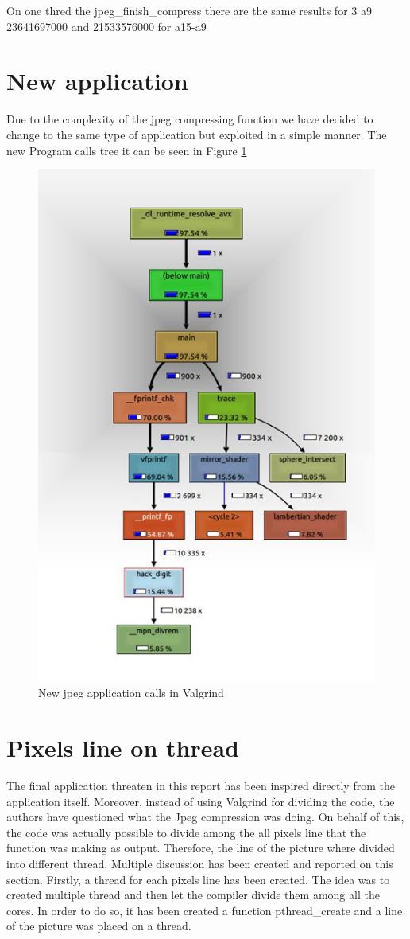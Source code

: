 \documentclass[journal]{IEEEtran}
\begin{document}
On one thred the jpeg\_finish\_compress there are the same results for 3 a9 23641697000 and 21533576000 for a15-a9



\section{New application}
Due to the complexity of the jpeg compressing function we have decided to change to the same type of application but exploited in a simple manner. The new Program calls tree it can be seen in Figure \ref{fig:valgrind2}

\begin{figure}[!h]
	\centering
	\includegraphics[width=.8\linewidth]{valgrind2}
	\caption{New jpeg application calls in Valgrind}
	\label{fig:valgrind2}
\end{figure}


\section{Pixels line on thread}
The final application threaten in this report has been inspired directly from the application itself. Moreover, instead of using Valgrind for dividing the code, the authors have questioned what the Jpeg compression was doing. On behalf of this, the code was actually possible to divide among the all pixels line that the function was making as output. Therefore, the line of the picture where divided into different thread. Multiple discussion has been created and reported on this section.
Firstly, a thread for each pixels line has been created. The idea was to created multiple thread and then let the compiler divide them among all the cores. 
In order to do so, it has been created a function pthread\_create and a line of the picture was placed on a thread.
\end{document}
